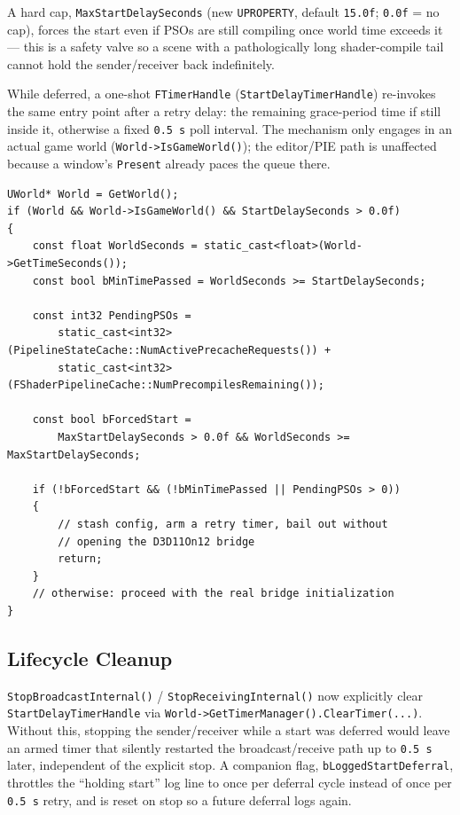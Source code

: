 \documentclass[11pt,a4paper]{article}
\begin{document}
A hard cap, \texttt{MaxStartDelaySeconds} (new \texttt{UPROPERTY}, default
\texttt{15.0f}; \texttt{0.0f} = no cap), forces the start even if PSOs are
still compiling once world time exceeds it --- this is a safety valve so a
scene with a pathologically long shader-compile tail cannot hold the
sender/receiver back indefinitely.

While deferred, a one-shot \texttt{FTimerHandle}
(\texttt{StartDelayTimerHandle}) re-invokes the same entry point after a
retry delay: the remaining grace-period time if still inside it, otherwise
a fixed \texttt{0.5\,s} poll interval. The mechanism only engages in an
actual game world (\texttt{World->IsGameWorld()}); the editor/PIE path is
unaffected because a window's \texttt{Present} already paces the queue
there.

\begin{lstlisting}[style=cpp,caption={Deferred-start gate (sender), abridged}]
UWorld* World = GetWorld();
if (World && World->IsGameWorld() && StartDelaySeconds > 0.0f)
{
    const float WorldSeconds = static_cast<float>(World->GetTimeSeconds());
    const bool bMinTimePassed = WorldSeconds >= StartDelaySeconds;

    const int32 PendingPSOs =
        static_cast<int32>(PipelineStateCache::NumActivePrecacheRequests()) +
        static_cast<int32>(FShaderPipelineCache::NumPrecompilesRemaining());

    const bool bForcedStart =
        MaxStartDelaySeconds > 0.0f && WorldSeconds >= MaxStartDelaySeconds;

    if (!bForcedStart && (!bMinTimePassed || PendingPSOs > 0))
    {
        // stash config, arm a retry timer, bail out without
        // opening the D3D11On12 bridge
        return;
    }
    // otherwise: proceed with the real bridge initialization
}
\end{lstlisting}

\subsection{Lifecycle Cleanup}
\texttt{StopBroadcastInternal()} / \texttt{StopReceivingInternal()} now
explicitly clear \texttt{StartDelayTimerHandle} via
\texttt{World->GetTimerManager().ClearTimer(...)}. Without this, stopping
the sender/receiver while a start was deferred would leave an armed timer
that silently restarted the broadcast/receive path up to \texttt{0.5\,s}
later, independent of the explicit stop. A companion flag,
\texttt{bLoggedStartDeferral}, throttles the ``holding start'' log line to
once per deferral cycle instead of once per \texttt{0.5\,s} retry, and is
reset on stop so a future deferral logs again.
\end{document}
